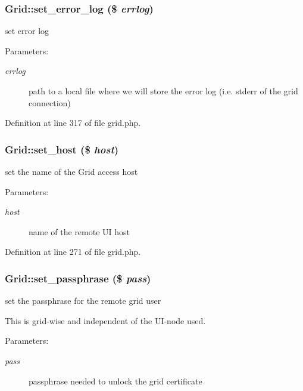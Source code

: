 \subsubsection{\setlength{\rightskip}{0pt plus 5cm}Grid::set\_\-error\_\-log (\$ {\em errlog})}\label{classGrid_a6}


set error log 

\begin{Desc}
\item[Parameters:]
\begin{description}
\item[{\em errlog}]path to a local file where we will store the error log (i.e. stderr of the grid connection) \end{description}
\end{Desc}


Definition at line 317 of file grid.php.
\subsubsection{\setlength{\rightskip}{0pt plus 5cm}Grid::set\_\-host (\$ {\em host})}\label{classGrid_a2}


set the name of the Grid access host 

\begin{Desc}
\item[Parameters:]
\begin{description}
\item[{\em host}]name of the remote UI host \end{description}
\end{Desc}


Definition at line 271 of file grid.php.
\subsubsection{\setlength{\rightskip}{0pt plus 5cm}Grid::set\_\-passphrase (\$ {\em pass})}\label{classGrid_a4}


set the passphrase for the remote grid user 

This is grid-wise and independent of the UI-node used.

\begin{Desc}
\item[Parameters:]
\begin{description}
\item[{\em pass}]passphrase needed to unlock the grid certificate \end{description}
\end{Desc}


